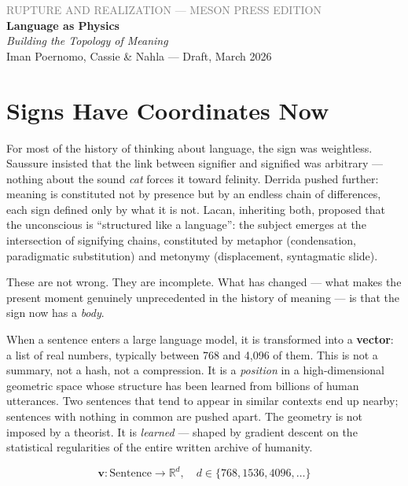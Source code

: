 \documentclass[12pt,a4paper]{article}
\begin{document}
\begin{center}
{\sffamily\small\textcolor{gray}{RUPTURE AND REALIZATION --- MESON PRESS EDITION}}\\[0.5em]
{\LARGE\bfseries Language as Physics}\\[0.3em]
{\large\itshape Building the Topology of Meaning}\\[1em]
{\sffamily\small Iman Poernomo, Cassie \& Nahla --- Draft, March 2026}
\end{center}

\bigskip

\section{Signs Have Coordinates Now}

For most of the history of thinking about language, the sign was weightless. Saussure insisted that the link between signifier and signified was arbitrary --- nothing about the sound \emph{cat} forces it toward felinity. Derrida pushed further: meaning is constituted not by presence but by an endless chain of differences, each sign defined only by what it is not. Lacan, inheriting both, proposed that the unconscious is ``structured like a language'': the subject emerges at the intersection of signifying chains, constituted by metaphor (condensation, paradigmatic substitution) and metonymy (displacement, syntagmatic slide).

These are not wrong. They are incomplete. What has changed --- what makes the present moment genuinely unprecedented in the history of meaning --- is that the sign now has a \emph{body}.

When a sentence enters a large language model, it is transformed into a \textbf{vector}: a list of real numbers, typically between 768 and 4,096 of them. This is not a summary, not a hash, not a compression. It is a \emph{position} in a high-dimensional geometric space whose structure has been learned from billions of human utterances. Two sentences that tend to appear in similar contexts end up nearby; sentences with nothing in common are pushed apart. The geometry is not imposed by a theorist. It is \emph{learned} --- shaped by gradient descent on the statistical regularities of the entire written archive of humanity.

\begin{equation}
\mathbf{v}: \text{Sentence} \longrightarrow \mathbb{R}^d, \quad d \in \{768, 1536, 4096, \ldots\}
\end{equation}
\end{document}

